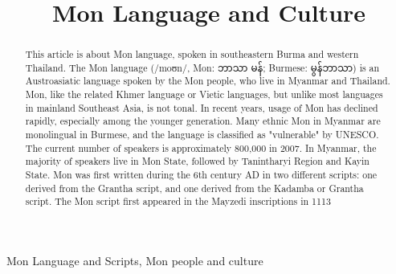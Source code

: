 \documentclass[conference]{IEEEtran}
\begin{document}
\title{Mon Language and Culture}

\author{
\and
{}
}

\maketitle

\begin{abstract}
This article is about Mon language, spoken in southeastern Burma and western Thailand. The Mon language ({\padauktext /moʊn/}, Mon: {\padauktext ဘာသာ မန်}; Burmese: {\padauktext မွန်ဘာသာ}) is an Austroasiatic language spoken by the Mon people, who live in Myanmar and Thailand. Mon, like the related Khmer language or Vietic languages, but unlike most languages in mainland Southeast Asia, is not tonal. In recent years, usage of Mon has declined rapidly, especially among the younger generation. Many ethnic Mon in Myanmar are monolingual in Burmese, and the language is classified as "vulnerable" by UNESCO. The current number of speakers is approximately 800,000 in 2007. In Myanmar, the majority of speakers live in Mon State, followed by Tanintharyi Region and Kayin State. Mon was first written during the 6th century AD in two different scripts: one derived from the Grantha script, and one derived from the Kadamba or Grantha script. The Mon script first appeared in the Mayzedi inscriptions in 1113
\end{abstract}

\begin{IEEEkeywords}
Mon Language and Scripts, Mon people and culture
\end{IEEEkeywords}
\end{document}

